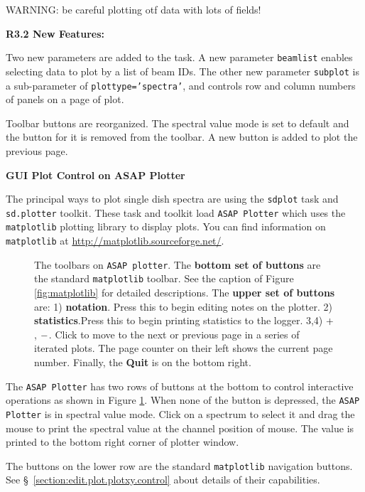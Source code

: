         WARNING: be careful plotting otf data with lots of fields!

\medskip  
{\bf R3.2 New Features:}

Two new parameters are added to the task. 
A new parameter {\tt beamlist} enables selecting data to plot by a list of beam IDs.
The other new parameter {\tt subplot} is a sub-parameter of {\tt plottype='spectra'}, 
and controls row and column numbers of panels on a page of plot.

Toolbar buttons are reorganized.
The spectral value mode is set to default and the button for it is removed from the toolbar.
A new button is added to plot the previous page.


\bigskip
{\bf GUI Plot Control on ASAP Plotter}

The principal ways to plot single dish spectra are using 
the {\tt sdplot} task and {\tt sd.plotter} toolkit. 
These task and toolkit load {\tt ASAP Plotter} which uses 
the {\tt matplotlib} plotting library to display plots. 
You can find information on {\tt matplotlib} at
\url{http://matplotlib.sourceforge.net/}.

\begin{figure}[h!]
\begin{center}
\caption{\label{fig:sdplot_toolbar}
  The toolbars on {\tt ASAP plotter}.
  The {\bf bottom set of buttons} are the standard {\tt matplotlib} toolbar. 
  See the caption of Figure \ref{fig:matplotlib} for detailed descriptions.
  The {\bf upper set of buttons} are:
  1) {\bf notation}. Press this to begin editing notes on the plotter. 
  2) {\bf statistics}.Press this to begin printing statistics to the logger.
  3,4) $ {\bf +} $, $ {\bf -} $. Click to move to the next or previous page in a series 
  of iterated plots. The page counter on their left shows the current page 
  number. Finally, the {\bf Quit} is on the bottom right.}
\hrulefill
\end{center}
\end{figure}

The {\tt ASAP Plotter} has two rows of buttons at the bottom to 
control interactive operations as shown in Figure \ref{fig:sdplot_toolbar}. 
When none of the button is depressed, the {\tt ASAP Plotter} is in spectral 
value mode. Click on a spectrum to select it and drag the mouse to print 
the spectral value at the channel position of mouse. The value is printed 
to the bottom right corner of plotter window.

The buttons on the lower row are the standard 
{\tt matplotlib} navigation buttons. 
See \S~\ref{section:edit.plot.plotxy.control} about details of their 
capabilities.

